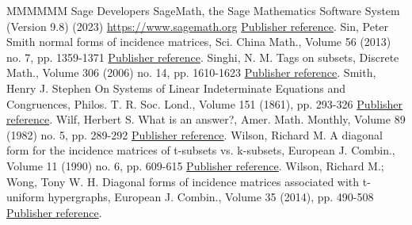 \begin{thebibliography}{MMMMMM}
 Sage Developers SageMath, the Sage Mathematics Software System (Version 9.8) (2023) \url{https://www.sagemath.org} \href{https://alco.centre-mersenne.org/articles/10.5802/alco.406/#sagemath}{Publisher reference}.
 Sin, Peter Smith normal forms of incidence matrices, Sci. China Math., Volume 56 (2013) no. 7, pp. 1359-1371 \href{https://alco.centre-mersenne.org/articles/10.5802/alco.406/#snf-inc}{Publisher reference}.
 Singhi, N. M. Tags on subsets, Discrete Math., Volume 306 (2006) no. 14, pp. 1610-1623 \href{https://alco.centre-mersenne.org/articles/10.5802/alco.406/#singhi}{Publisher reference}.
 Smith, Henry J. Stephen On Systems of Linear Indeterminate Equations and Congruences, Philos. T. R. Soc. Lond., Volume 151 (1861), pp. 293-326 \href{https://alco.centre-mersenne.org/articles/10.5802/alco.406/#smith1861}{Publisher reference}.
 Wilf, Herbert S. What is an answer?, Amer. Math. Monthly, Volume 89 (1982) no. 5, pp. 289-292 \href{https://alco.centre-mersenne.org/articles/10.5802/alco.406/#wilf}{Publisher reference}.
 Wilson, Richard M. A diagonal form for the incidence matrices of t-subsets vs. k-subsets, European J. Combin., Volume 11 (1990) no. 6, pp. 609-615 \href{https://alco.centre-mersenne.org/articles/10.5802/alco.406/#wilson_classic}{Publisher reference}.
 Wilson, Richard M.; Wong, Tony W. H. Diagonal forms of incidence matrices associated with t-uniform hypergraphs, European J. Combin., Volume 35 (2014), pp. 490-508 \href{https://alco.centre-mersenne.org/articles/10.5802/alco.406/#wong}{Publisher reference}.
\end{thebibliography}
